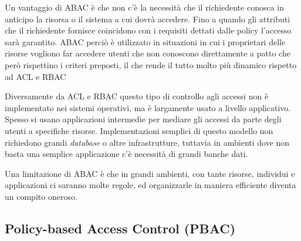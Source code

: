 Un vantaggio di \ac{ABAC} è che non c'è la necessità che il richiedente conosca in anticipo
la risorsa o il sistema a cui dovrà accedere. Fino a quando gli attributi che il richiedente fornisce 
coincidono con i requisiti dettati dalle policy l'accesso sarà garantito. \ac{ABAC} perciò è utilizzato in situazioni in 
cui i proprietari delle risorse vogliono far accedere utenti che non conoscono direttamente a patto che però rispettino i criteri preposti, il che rende il tutto molto più dinamico rispetto ad \ac{ACL} e \ac{RBAC} \par
Diversamente da \ac{ACL} e \ac{RBAC} questo tipo di controllo agli 
accessi non è implementato nei sistemi operativi, ma è largamente usato a livello applicativo.
Spesso si usano applicazioni intermedie per mediare gli accessi da parte degli utenti a specifiche risorse.
Implementazioni semplici di questo modello non richiedono grandi \textit{database} o altre infrastrutture, tuttavia in ambienti dove non basta una semplice applicazione c'è necessità di grandi banche dati.\par
Una limitazione di \ac{ABAC} è che in grandi ambienti, con tante risorse, individui e applicazioni ci saranno molte regole, ed organizzarle in maniera efficiente diventa un compito oneroso.


\subsection*{Policy-based Access Control (PBAC)} %
\label{sub:policy_based_access_control_}

